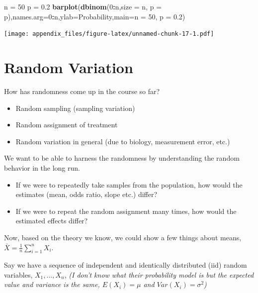 \documentclass[
]{book}
\newenvironment{Shaded}{\begin{snugshade}}{\end{snugshade}}
\newcommand{\AttributeTok}[1]{\textcolor[rgb]{0.13,0.29,0.53}{#1}}
\newcommand{\DecValTok}[1]{\textcolor[rgb]{0.00,0.00,0.81}{#1}}
\newcommand{\FloatTok}[1]{\textcolor[rgb]{0.00,0.00,0.81}{#1}}
\newcommand{\FunctionTok}[1]{\textcolor[rgb]{0.13,0.29,0.53}{\textbf{#1}}}
\newcommand{\NormalTok}[1]{#1}
\newcommand{\OtherTok}[1]{\textcolor[rgb]{0.56,0.35,0.01}{#1}}
\newcommand{\SpecialCharTok}[1]{\textcolor[rgb]{0.81,0.36,0.00}{\textbf{#1}}}
\newcommand{\StringTok}[1]{\textcolor[rgb]{0.31,0.60,0.02}{#1}}
\providecommand{\tightlist}{%
  \setlength{\itemsep}{0pt}\setlength{\parskip}{0pt}}
\begin{document}
\begin{Shaded}
\begin{Highlighting}[]
\NormalTok{n }\OtherTok{=} \DecValTok{50}
\NormalTok{p }\OtherTok{=} \FloatTok{0.2}
\FunctionTok{barplot}\NormalTok{(}\FunctionTok{dbinom}\NormalTok{(}\DecValTok{0}\SpecialCharTok{:}\NormalTok{n,}\AttributeTok{size =}\NormalTok{ n, }\AttributeTok{p =}\NormalTok{ p),}\AttributeTok{names.arg=}\DecValTok{0}\SpecialCharTok{:}\NormalTok{n,}\AttributeTok{ylab=}\StringTok{\textquotesingle{}Probability\textquotesingle{}}\NormalTok{,}\AttributeTok{main=}\StringTok{\textquotesingle{}n = 50, p = 0.2\textquotesingle{}}\NormalTok{)}
\end{Highlighting}
\end{Shaded}

\texttt{[image: appendix\_files/figure-latex/unnamed-chunk-17-1.pdf]}

\section{Random Variation}\label{random-variation}

How has randomness come up in the course so far?

\begin{itemize}
\tightlist
\item
  Random sampling (sampling variation)
\item
  Random assignment of treatment
\item
  Random variation in general (due to biology, measurement error, etc.)
\end{itemize}

We want to be able to harness the randomness by understanding the random behavior in the long run.

\begin{itemize}
\tightlist
\item
  If we were to repeatedly take samples from the population, how would the estimates (mean, odds ratio, slope etc.) differ?
\item
  If we were to repeat the random assignment many times, how would the estimated effects differ?
\end{itemize}

Now, based on the theory we know, we could show a few things about means, \(\bar{X} = \frac{1}{n}\sum_{i=1}^n X_i\).

Say we have a sequence of independent and identically distributed (iid) random variables, \(X_1,...,X_n\), \emph{(I don't know what their probability model is but the expected value and variance is the same, \(E(X_i) = \mu\) and \(Var(X_i) = \sigma^2\))}
\end{document}
